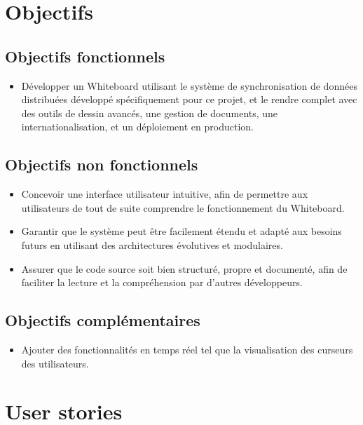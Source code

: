 \section*{Objectifs}

\subsection*{Objectifs \guillemotleft fonctionnels\guillemotright}

\begin{itemize}
    \item Développer un Whiteboard utilisant le système de synchronisation de données distribuées développé spécifiquement pour ce projet, et le rendre complet avec des outils de dessin avancés, une gestion de documents, une internationalisation, et un déploiement en production.
\end{itemize}

\subsection*{Objectifs \guillemotleft non fonctionnels\guillemotright}

\begin{itemize}
    \item Concevoir une interface utilisateur intuitive, afin de permettre aux utilisateurs de tout de suite comprendre le fonctionnement du Whiteboard.
    \item Garantir que le système peut être facilement étendu et adapté aux besoins futurs en utilisant des architectures évolutives et modulaires.
    \item Assurer que le code source soit bien structuré, propre et documenté, afin de faciliter la lecture et la compréhension par d'autres développeurs.
\end{itemize}

\subsection*{Objectifs \guillemotleft complémentaires\guillemotright}

\begin{itemize}
    \item Ajouter des fonctionnalités en temps réel tel que la visualisation des curseurs des utilisateurs.
\end{itemize}

\section*{User stories}
